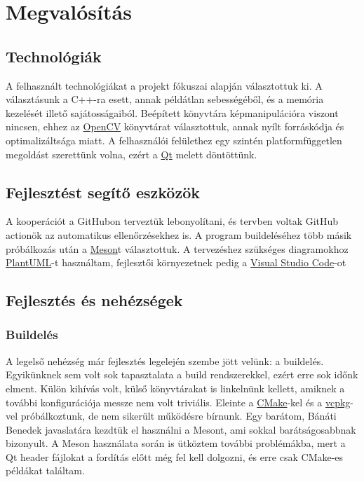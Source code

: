 \chapter{Megvalósítás}

\section{Technológiák}

A felhasznált technológiákat a projekt fókuszai alapján választottuk ki. 
A választásunk a C++-ra esett, annak példátlan sebességéből, és a memória kezelését illető sajátosságaiból. Beépített könyvtára képmanipulációra viszont nincsen, ehhez az \href{https://en.wikipedia.org/wiki/OpenCV}{OpenCV} könyvtárat választottuk, annak nyílt forráskódja és optimalizáltsága miatt.
A felhasználói felülethez egy szintén platformfüggetlen megoldást szerettünk volna, ezért a \href{https://en.wikipedia.org/wiki/Qt_(software)}{Qt} melett döntöttünk. 

\section{Fejlesztést segítő eszközök}

A kooperációt a GitHubon terveztük lebonyolítani, és tervben voltak GitHub actionök az automatikus ellenőrzésekhez is. A program buildeléséhez több másik próbálkozás után a \href{https://en.wikipedia.org/wiki/Meson_(software)}{Meson}t választottuk. A tervezéshez szükséges diagramokhoz \href{https://en.wikipedia.org/wiki/PlantUML}{PlantUML}-t használtam, fejlesztői környezetnek pedig a \href{https://en.wikipedia.org/wiki/Visual_Studio_Code}{Visual Studio Code}-ot

\section{Fejlesztés és nehézségek}

\subsection{Buildelés}

A legelső nehézség már fejlesztés legelején szembe jött velünk: a buildelés. Egyikünknek sem volt sok tapasztalata a build rendszerekkel, ezért erre sok időnk elment. Külön kihívás volt, külső könyvtárakat is linkelnünk kellett, amiknek a további konfigurációja messze nem volt triviális. Eleinte a \href{https://en.wikipedia.org/wiki/CMake}{CMake}-kel és a \href{https://en.wikipedia.org/wiki/Vcpkg}{vcpkg}-vel próbálkoztunk, de nem sikerült működésre bírnunk. Egy barátom, Bánáti Benedek javaslatára kezdtük el használni a Mesont, ami sokkal barátságosabbnak bizonyult. A Meson használata során is ütköztem további problémákba, mert a Qt header fájlokat a fordítás előtt még fel kell dolgozni, és erre csak CMake-es példákat találtam.

